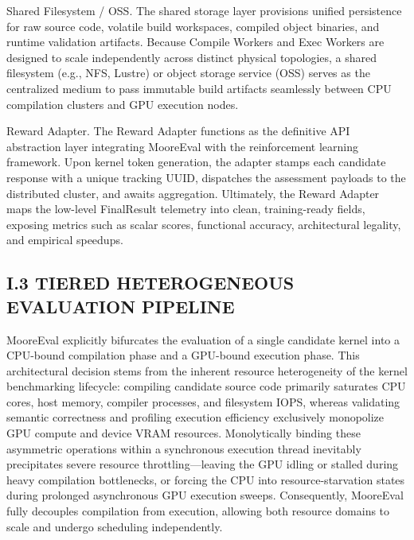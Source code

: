 \documentclass[
  10
]{article}
\begin{document}
Shared Filesystem / OSS. The shared storage layer provisions unified
persistence for raw source code, volatile build workspaces, compiled
object binaries, and runtime validation artifacts. Because Compile
Workers and Exec Workers are designed to scale independently across
distinct physical topologies, a shared filesystem (e.g., NFS, Lustre) or
object storage service (OSS) serves as the centralized medium to pass
immutable build artifacts seamlessly between CPU compilation clusters
and GPU execution nodes.

Reward Adapter. The Reward Adapter functions as the definitive API
abstraction layer integrating MooreEval with the reinforcement learning
framework. Upon kernel token generation, the adapter stamps each
candidate response with a unique tracking UUID, dispatches the
assessment payloads to the distributed cluster, and awaits aggregation.
Ultimately, the Reward Adapter maps the low-level FinalResult telemetry
into clean, training-ready fields, exposing metrics such as scalar
scores, functional accuracy, architectural legality, and empirical
speedups.

\subsection{I.3 TIERED HETEROGENEOUS EVALUATION
PIPELINE}\label{i.3-tiered-heterogeneous-evaluation-pipeline}

MooreEval explicitly bifurcates the evaluation of a single candidate
kernel into a CPU-bound compilation phase and a GPU-bound execution
phase. This architectural decision stems from the inherent resource
heterogeneity of the kernel benchmarking lifecycle: compiling candidate
source code primarily saturates CPU cores, host memory, compiler
processes, and filesystem IOPS, whereas validating semantic correctness
and profiling execution efficiency exclusively monopolize GPU compute
and device VRAM resources. Monolytically binding these asymmetric
operations within a synchronous execution thread inevitably precipitates
severe resource throttling---leaving the GPU idling or stalled during
heavy compilation bottlenecks, or forcing the CPU into
resource-starvation states during prolonged asynchronous GPU execution
sweeps. Consequently, MooreEval fully decouples compilation from
execution, allowing both resource domains to scale and undergo
scheduling independently.
\end{document}

